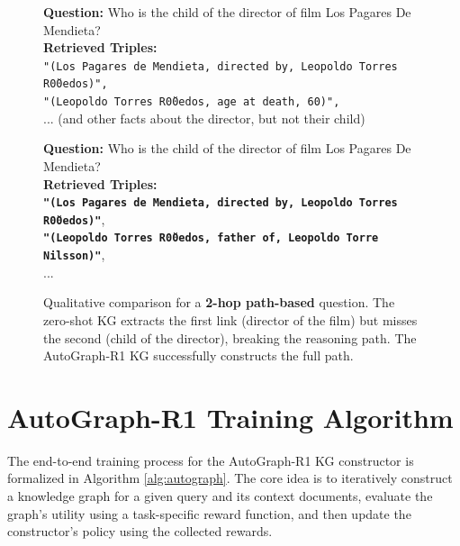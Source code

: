 \documentclass[11pt]{article}
\begin{document}
\begin{figure}[t]
{\begin{minipage}{\linewidth}
            \vspace{0.2in} %
            
            \begin{tcolorbox}[colback=black!5!white,colframe=black!75!black,title=Case Study 2: Zero-Shot KG (ToG Retriever) - \textbf{Failed Answer}]
                \textbf{Question:} Who is the child of the director of film Los Pagares De Mendieta? \\
                \textbf{Retrieved Triples:} \\
                \texttt{"(Los Pagares de Mendieta, directed by, Leopoldo Torres R\u00edos)",} \\ 
                \texttt{"(Leopoldo Torres R\u00edos, age at death, 60)",} \\
                ... (and other facts about the director, but not their child)
            \end{tcolorbox}
            \begin{tcolorbox}[colback=blue!5!white,colframe=blue!75!black,title=Case Study 2: AutoGraph-R1 KG (ToG Retriever) - \textbf{Correct Answer}]
                \textbf{Question:} Who is the child of the director of film Los Pagares De Mendieta? \\
                \textbf{Retrieved Triples:} \\
                \texttt{\textbf{"(Los Pagares de Mendieta, directed by, Leopoldo Torres R\u00edos)"}}, \\
                \texttt{\textbf{"(Leopoldo Torres R\u00edos, father of, Leopoldo Torre Nilsson)"}}, \\
                ...
            \end{tcolorbox}

            \caption{Qualitative comparison for a \textbf{2-hop path-based} question. The zero-shot KG extracts the first link (director of the film) but misses the second (child of the director), breaking the reasoning path. The AutoGraph-R1 KG successfully constructs the full path.}
            \label{fig:case_study_path}
            
        \end{minipage}
    }
\end{figure}



\clearpage

\section{AutoGraph-R1 Training Algorithm}
\label{sec:appendix_algorithm}
The end-to-end training process for the AutoGraph-R1 KG constructor is formalized in Algorithm \ref{alg:autograph}. The core idea is to iteratively construct a knowledge graph for a given query and its context documents, evaluate the graph's utility using a task-specific reward function, and then update the constructor's policy using the collected rewards.
\end{document}
